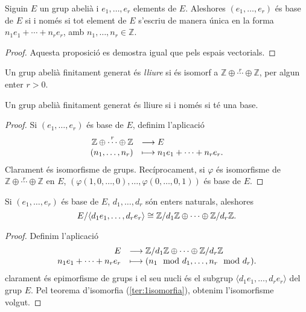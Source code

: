 \documentclass[../main.tex]{subfiles}
\begin{document}
\begin{prop}
Siguin $E$ un grup abelià i $e_1,\ldots,e_r$ elements de $E$. Aleshores $(e_1, \ldots, e_r)$ és base de $E$ si i només si tot element de $E$ s'escriu de manera única en la forma $n_1e_1+\cdots+n_re_r$, amb $n_1,\ldots,n_r\in \mathbb{Z}$.
\end{prop}
\begin{proof}
Aquesta proposició es demostra igual que pels espais vectorials.
\end{proof}

\begin{defi}
Un grup abelià finitament generat és \textit{lliure} si és isomorf a $\mathbb{Z}\oplus\overset{r}{\cdots}\oplus\mathbb{Z}$, per algun enter $r>0$.
\end{defi}

\begin{prop}
Un grup abelià finitament generat és lliure si i només si té una base.
\end{prop}
\begin{proof}
Si $(e_1,\ldots,e_r)$ és base de $E$, definim l'aplicació
\begin{equation}
    \notag
    \begin{array}{rl}
        \mathbb{Z}\oplus\overset{r}{\cdots}\oplus\mathbb{Z} & \longrightarrow E \\
        (n_1,\ldots,n_r) & \longmapsto n_1e_1+\cdots+n_re_r.
    \end{array}
\end{equation}
Clarament és isomorfisme de grups. Recíprocament, si $\varphi$ és isomorfisme de $\mathbb{Z}\oplus\overset{r}{\cdots}\oplus\mathbb{Z}$ en $E$, $(\varphi(1,0,\ldots,0),\ldots,\varphi(0,\ldots,0,1))$ és base de $E$.
\end{proof}

\begin{lema}\label{lema:lemalema}
Si $(e_1,\ldots,e_r)$ és base de $E$, $d_1,\ldots,d_r$ són enters naturals, aleshores
\begin{equation}
    \notag
    E/\langle d_1e_1,\ldots,d_re_r\rangle\cong \mathbb{Z}/d_1\mathbb{Z}\oplus\cdots\oplus\mathbb{Z}/d_r\mathbb{Z}.
\end{equation}
\end{lema}
\begin{proof}
Definim l'aplicació
\begin{equation}
    \notag
    \begin{array}{rl}
        E & \longrightarrow \mathbb{Z}/d_1\mathbb{Z}\oplus\cdots\oplus\mathbb{Z}/d_r\mathbb{Z} \\
        n_1e_1+\cdots+n_re_r & \longmapsto (n_1\mod d_1,\ldots,n_r\mod d_r).
    \end{array}
\end{equation}
clarament és epimorfisme de grups i el seu nucli és el subgrup $\langle d_1e_1,\ldots,d_re_r\rangle$ del grup $E$. Pel teorema d'isomorfia (\ref{ter:1isomorfia}), obtenim l'isomorfisme volgut.
\end{proof}
\end{document}
